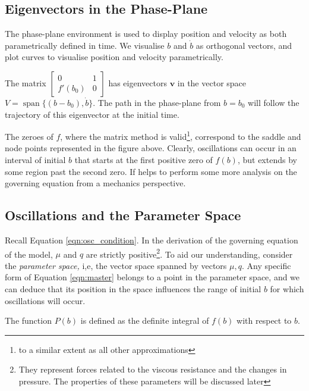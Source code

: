 \documentclass{article}
\begin{document}
\subsection{Eigenvectors in the Phase-Plane}

The phase-plane environment is used to display position and velocity as both parametrically defined in time.
We visualise $b$ and $\dot{b}$ as orthogonal vectors, and plot curves to visualise position and velocity parametrically.


The matrix $\begin{bmatrix}
	0 & 1 \\
	f'(b_0) & 0
\end{bmatrix}$ has eigenvectors $\mathbf{v}$ in the vector space $V = \operatorname{span}\{(b-b_0),\dot{b}\}$.
The path in the phase-plane from $b=b_0$ will follow the trajectory of this eigenvector at the initial time.


The zeroes of $f$, where the matrix method is valid\footnote{to a similar extent as all other approximations},
correspond to the saddle and node points represented in the figure above. %
Clearly, oscillations can occur in an interval of initial $b$ that starts at the first positive zero of $f(b)$,
but extends by some region past the second zero.
If helps to perform some more analysis on the governing equation from a mechanics perspective.

\subsection{Oscillations and the Parameter Space}

Recall Equation \ref{eqn:osc_condition}. In the derivation of the governing equation of the model, $\mu$ and $q$ are strictly positive\footnote{They represent forces related to the viscous resistance and the changes in pressure. The properties of these parameters will be discussed later}.
To aid our understanding, consider the \textit{parameter space,} i,e, the vector space spanned by vectors $\mu, q$.
Any specific form of Equation \ref{eqn:master} belongs to a point in the parameter space,
and we can deduce that its position in the space influences the range of initial $b$ for which oscillations will occur. 


The function $P(b)$ is defined as the definite integral of $f(b)$ with respect to $b$.
\end{document}
